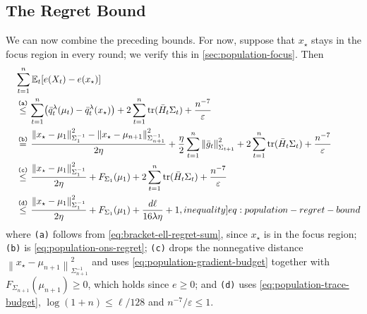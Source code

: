 \documentclass[12pt,cleveref]{jmlr}
\newcommand{\ineqlabel}[1]{\label[inequality]{#1}}
\newcommand{\reason}[1]{\texttt{(#1)}}
\newcommand{\explan}[2]{\stackrel{\reason{#2}}{#1}}
\newcommand{\E}{\mathbb E}
\newcommand{\tr}{\operatorname{tr}}
\newcommand{\1}{\mathbf 1}
\newcommand{\eps}{\varepsilon}
\newcommand{\normm}[2]{\left\lVert #1\right\rVert_{#2}}
\begin{document}
\subsection{The Regret Bound}
We can now combine the preceding bounds.
For now, suppose that $x_\star$ stays in the focus region in every round; we verify this in \cref{sec:population-focus}.
Then
\begin{align}
    & \sum_{t=1}^n\E_t[e(X_t)-e(x_\star)] \\
    \quad &
    \explan{\leq}{a}
    \sum_{t=1}^n\bigl(\bar q_t^\lambda(\mu_t)-\bar q_t^\lambda(x_\star)\bigr)
    +2\sum_{t=1}^n\tr(\bar H_t\Sigma_t)
    +\frac{n^{-7}}{\eps}
    \\
    & \explan{=}{b}
    \frac{\normm{x_\star-\mu_1}{\Sigma_1^{-1}}^2-\normm{x_\star-\mu_{n+1}}{\Sigma_{n+1}^{-1}}^2}{2\eta}
    +\frac\eta2\sum_{t=1}^n\normm{\bar g_t}{\Sigma_{t+1}}^2
    +2\sum_{t=1}^n\tr(\bar H_t\Sigma_t)
    +\frac{n^{-7}}{\eps}
    \\
    & \explan{\leq}{c}
    \frac{\normm{x_\star-\mu_1}{\Sigma_1^{-1}}^2}{2\eta}
    +F_{\Sigma_1}(\mu_1)
    +2\sum_{t=1}^n\tr(\bar H_t\Sigma_t)
    +\frac{n^{-7}}{\eps}
    \\
    & \explan{\leq}{d}
    \frac{\normm{x_\star-\mu_1}{\Sigma_1^{-1}}^2}{2\eta}
    +F_{\Sigma_1}(\mu_1)
    +\frac{d\ell}{16\lambda\eta}
    +1,
    \ineqlabel{eq:population-regret-bound}
\end{align}
where
\reason{a} follows from \cref{eq:bracket-ell-regret-sum}, since $x_\star$ is in the focus region;
\reason{b} is \cref{eq:population-ons-regret};
\reason{c} drops the nonnegative distance $\normm{x_\star-\mu_{n+1}}{\Sigma_{n+1}^{-1}}^2$ and uses \cref{eq:population-gradient-budget} together with $F_{\Sigma_{n+1}}(\mu_{n+1})\geq0$, which holds since $e\geq0$;
and \reason{d} uses \cref{eq:population-trace-budget}, $\log(1+n)\leq\ell/128$ and $n^{-7}/\eps\leq1$.
\end{document}
